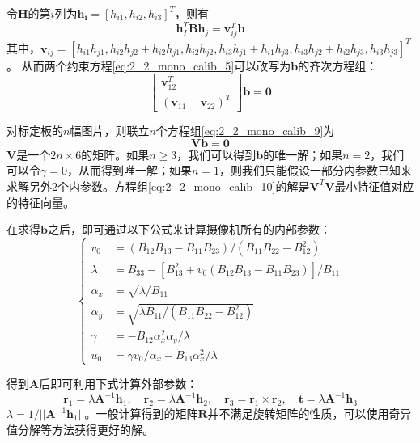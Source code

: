 令$\mathbf{H}$的第$i$列为$\mathbf{h_i} = [h_{i1}, h_{i2}, h_{i3}]^T$，则有
%
\begin{equation}\label{eq:2_2_mono_calib_8}
\mathbf{h}_I^T \mathbf{B} \mathbf{h}_j = \mathbf{v}_{ij}^T \mathbf{b}
\end{equation}
其中，$\mathbf{v}_{ij} = [h_{i1} h_{j1}, h_{i2} h_{j2} + h_{i2} h_{j1}, h_{i2} h_{j2}, h_{i3} h_{j1} +h_{i1} h_{j3}, h_{i3} h_{j2} + h_{i2} h_{j3}, h_{i3} h_{j3}]^T$。
从而两个约束方程\ref{eq:2_2_mono_calib_5}可以改写为$\mathbf{b}$的齐次方程组：
%
\begin{equation}\label{eq:2_2_mono_calib_9}
\begin{bmatrix}
\mathbf{v}_{12}^T \\ (\mathbf{v}_{11} - \mathbf{v}_{22})^T
\end{bmatrix}
\mathbf{b} = \mathbf{0}
\end{equation}

对标定板的$n$幅图片，则联立$n$个方程组\ref{eq:2_2_mono_calib_9}为
%
\begin{equation}\label{eq:2_2_mono_calib_10}
\mathbf{Vb} = \mathbf{0}
\end{equation}
$\mathbf{V}$是一个$2n \times 6$的矩阵。如果$n \geq 3$，我们可以得到$\mathbf{b}$的唯一解；如果$n = 2$，我们可以令$\gamma=0$，从而得到唯一解；如果$n=1$，则我们只能假设一部分内参数已知来求解另外2个内参数。方程组\ref{eq:2_2_mono_calib_10}的解是$\mathbf{V}^T\mathbf{V}$最小特征值对应的特征向量。

在求得$\mathbf{b}$之后，即可通过以下公式来计算摄像机所有的内部参数：
%
\begin{equation}\label{eq:2_2_mono_calib_11}
\left\{ 
\begin{aligned}
v_0 &= (B_{12}B_{13}-B_{11}B_{23}) / (B_{11}B_{22} - B_{12}^2) \\
\lambda &= B_{33} - [B_{13}^2 + v_0 (B_{12}B_{13} - B_{11}B_{23})] / B_{11} \\
\alpha_x &= \sqrt{\lambda / B_{11}} \\
\alpha_y &= \sqrt{\lambda B_{11} / (B_{11}B_{22} - B_{12}^2)} \\
\gamma &= -B_{12}\alpha_x^2 \alpha_y / \lambda \\
u_0 &= \gamma v_0 / \alpha_x - B_{13} \alpha_x^2 / \lambda
\end{aligned}
\right.
\end{equation}

得到$\mathbf{A}$后即可利用下式计算外部参数：
%
\begin{equation}\label{eq:2_2_mono_calib_12}
\mathbf{r}_1 = \lambda \mathbf{A}^{-1}\mathbf{h}_1, \quad
\mathbf{r}_2 = \lambda \mathbf{A}^{-1}\mathbf{h}_2, \quad
\mathbf{r}_3 = \mathbf{r}_1 \times \mathbf{r}_2, \quad
\mathbf{t} = \lambda \mathbf{A}^{-1}\mathbf{h}_3
\end{equation}
$\lambda = 1/||\mathbf{A}^{-1}\mathbf{h}_1||$。一般计算得到的矩阵$\mathbf{R}$并不满足旋转矩阵的性质，可以使用奇异值分解等方法获得更好的解。

